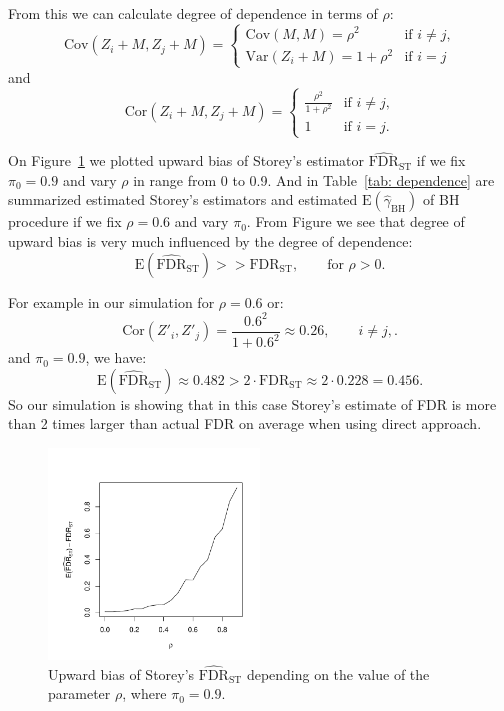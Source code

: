 \documentclass[10pt]{article}
\begin{document}
$\newcommand{\E}{\mathrm{E}}$
$\newcommand{\Var}{\mathrm{Var}}$
$\newcommand{\Cov}{\mathrm{Cov}}$

From this we can calculate degree of dependence in terms of $\rho$:
\[
\mathrm{Cov} (Z_{i} + M, Z_{j} + M) = \begin{cases}
	\mathrm{Cov}(M, M) = \rho^2 & \text{if $i \neq j$,}\\
	\mathrm{Var}(Z_{i} + M) = 1 + \rho^2 & \text{if $i = j$}
\end{cases}
\]
and 
\[
\mathrm{Cor} (Z_{i} + M, Z_{j} + M) = \begin{cases}
	\frac{\rho^2}{1 + \rho^2} & \text{if $i \neq j$,}\\
	1 & \text{if $i = j$.}
\end{cases}
\]

On Figure~\ref{fig: dependence} we plotted upward bias of Storey's estimator $\widehat{\text{FDR}}_{\text{ST}}$ if we fix $\pi_{0} = 0.9$ and vary $\rho$ in range from 0 to 0.9. And in Table~\ref{tab: dependence} are summarized estimated Storey's estimators and estimated $\text{E}(\widehat{\gamma}_{\text{BH}})$ of BH procedure if we fix $\rho = 0.6$ and vary $\pi_{0}$. From Figure we see that degree of upward bias is very much influenced by the degree of dependence:
\begin{equation}
\text{E}(\widehat{\text{FDR}}_{\text{ST}}) >> \text{FDR}_{\text{ST}}, \qquad \text{for  } \rho > 0.
\end{equation}

For example in our simulation for $\rho = 0.6$ or:
\begin{equation}
	\mathrm{Cor}(Z'_{i}, Z'_{j}) = \frac{0.6^2}{1 + 0.6^2} \approx 0.26, \qquad i \neq j,
.\end{equation}
and $\pi_{0} = 0.9$, we have:
\begin{equation}
	\text{E}(\widehat{\text{FDR}}_{\text{ST}}) \approx 0.482 > 2 \cdot \text{FDR}_{\text{ST}} \approx 2 \cdot 0.228 = 0.456.
\end{equation}
So our simulation is showing that in this case Storey's estimate of FDR is more than 2 times larger than actual FDR on average when using direct approach.


\begin{figure}[H]
	\centering
	\includegraphics[width=0.5\textwidth]{FDR_of_ro.pdf}
	\caption{Upward bias of Storey's $\widehat{\text{FDR}}_{\text{ST}}$ depending on the value of the parameter $\rho$, where $\pi_{0} = 0.9$.}
	\label{fig: dependence}	
\end{figure}
\end{document}
